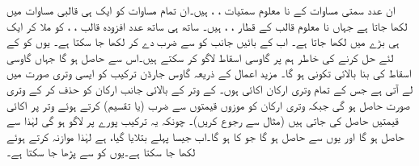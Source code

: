 ان  عدد سمتی مساوات کے نا معلوم سمتیات ، ،  ہیں۔ان تمام مساوات کو ایک ہی قالبی مساوات  میں لکھا جاتا ہے جہاں نا معلوم قالب  کے قطار ، ،  ہیں۔ ساتھ ہی ساتھ  عدد افزودہ قالب ، ،   کو ملا کر ایک ہی   بڑے   میں لکھا جاتا ہے۔ اب  کے بائیں جانب کو  سے ضرب دے کر  لکھا جا سکتا ہے۔  یوں  کو  کے لئے حل کرنے کی خاطر ہم  پر گاوسی اسقاط لاگو  کر سکتے ہیں۔اس سے  حاصل ہو گا جہاں گاوسی اسقاط کی بنا  بالائی تکونی ہو گا۔ مزید اعمال کے ذریعہ گاوس جارڈن ترکیب  کو ایسی وتری صورت میں لے آتی ہے جس کے تمام وتری ارکان اکائی  ہوں۔ کے وتر کے بالائی جانب ارکان کو حذف کر کے وتری صورت حاصل ہو گی جبکہ وتری ارکان کو موزوں قیمتوں سے ضرب (یا تقسیم) کرتے ہوئے وتر پر اکائی قیمتیں حاصل کی جاتی ہیں (مثال  سے رجوع کریں)۔ چونکہ یہ ترکیب پورے  پر لاگو ہو گی لہٰذا  سے  حاصل ہو گا اور یوں  سے  حاصل ہو گا جو  کا  ہو گا۔اب جیسا پہلے بتلایا گیا،  ہے لہٰذا موازنہ کرتے ہوئے  لکھا جا سکتا ہے۔یوں  کو  سے پڑھا جا سکتا ہے۔

